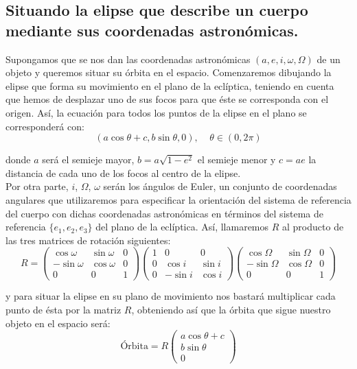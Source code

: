 \documentclass[11pt]{book}
\begin{document}
\subsection{Situando la elipse que describe un cuerpo mediante sus coordenadas astronómicas.}
\label{subsec:set_ellipse_position}
Supongamos que se nos dan las coordenadas astronómicas $(a,e,i,\omega,\Omega)$ de un objeto y queremos situar su órbita en el espacio. Comenzaremos dibujando la elipse que forma su movimiento en el plano de la eclíptica, teniendo en cuenta que hemos de desplazar uno de sus focos para que éste se corresponda con el origen. Así, la ecuación para todos los puntos de la elipse en el plano se corresponderá con:
\[
(a\cos{\theta}+c, b\sin{\theta}, 0), \; \; \; \; \theta\in(0,2\pi)
\]

\noindent donde $a$ será el semieje mayor, $b=a\sqrt{1-e^2}$ el semieje menor y $c=ae$ la distancia de cada uno de los focos al centro de la elipse.\\

Por otra parte, $i$, $\Omega$, $\omega$ serán los ángulos de Euler\cite{euler_angles}, un conjunto de coordenadas angulares que utilizaremos para especificar la orientación del sistema de referencia del cuerpo con dichas coordenadas astronómicas en términos del sistema de referencia $\{e_1,e_2,e_3\}$ del plano de la eclíptica. Así, llamaremos $R$ al producto de las tres matrices de rotación siguientes:
\[
R=
\left(
\begin{array}{ccc}
	\cos{\omega} & \sin{\omega} & 0 \\
	-\sin{\omega} & \cos{\omega} & 0 \\
	0 & 0 & 1
\end{array}
\right)
\left(
\begin{array}{ccc}
	1 & 0 & 0 \\
	0 & \cos{i} & \sin{i} \\
	0 & -\sin{i} & \cos{i}
\end{array}
\right)
\left(
\begin{array}{ccc}
	\cos{\Omega} & \sin{\Omega} & 0 \\
	-\sin{\Omega} & \cos{\Omega} & 0 \\
	0 & 0 & 1
\end{array}
\right)
\]

\noindent y para situar la elipse en su plano de movimiento nos bastará multiplicar cada punto de ésta por la matriz $R$, obteniendo así que la órbita que sigue nuestro objeto en el espacio será:
\[
\text{Órbita}=R
\left(
\begin{array}{c}
a\cos{\theta}+c \\ b\sin{\theta} \\ 0
\end{array}
\right)
\]
\end{document}
